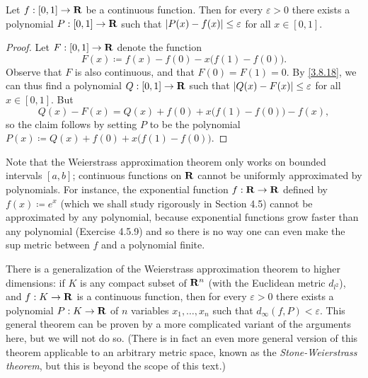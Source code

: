 \begin{corollary}\label{3.8.19}
  Let \(f : [0, 1] \to \mathbf{R}\) be a continuous function.
  Then for every \(\varepsilon > 0\) there exists a polynomial \(P : [0, 1] \to \mathbf{R}\) such that \(\left\lvert P(x) - f(x)\right\rvert \leq \varepsilon\) for all \(x \in [0, 1]\).
\end{corollary}

\begin{proof}
  Let \(F : [0, 1] \to \mathbf{R}\) denote the function
  \[
    F(x) \coloneqq f(x) - f(0) - x \big(f(1) - f(0)\big).
  \]
  Observe that \(F\) is also continuous, and that \(F(0) = F(1) = 0\).
  By \cref{3.8.18}, we can thus find a polynomial \(Q : [0, 1] \to \mathbf{R}\) such that \(\left\lvert Q(x) - F(x)\right\rvert \leq \varepsilon\) for all \(x \in [0, 1]\).
  But
  \[
    Q(x) - F(x) = Q(x) + f(0) + x \big(f(1) - f(0)\big) - f(x),
  \]
  so the claim follows by setting \(P\) to be the polynomial \(P(x) \coloneqq Q(x) + f(0) + x \big(f(1) - f(0)\big)\).
\end{proof}

\begin{remark}\label{3.8.20}
  Note that the Weierstrass approximation theorem only works on bounded intervals \([a, b]\);
  continuous functions on \(\mathbf{R}\) cannot be uniformly approximated by polynomials.
  For instance, the exponential function \(f : \mathbf{R} \to \mathbf{R}\) defined by \(f(x) \coloneqq e^x\) (which we shall study rigorously in Section 4.5) cannot be approximated by any polynomial, because exponential functions grow faster than any polynomial (Exercise 4.5.9) and so there is no way one can even make the sup metric between \(f\) and a polynomial finite.
\end{remark}

\begin{remark}\label{3.8.21}
  There is a generalization of the Weierstrass approximation theorem to higher dimensions:
  if \(K\) is any compact subset of \(\mathbf{R}^n\) (with the Euclidean metric \(d_{l^2}\)), and \(f : K \to \mathbf{R}\) is a continuous function, then for every \(\varepsilon > 0\) there exists a polynomial \(P : K \to \mathbf{R}\) of \(n\) variables \(x_1, \dots, x_n\) such that \(d_\infty(f, P) < \varepsilon\).
  This general theorem can be proven by a more complicated variant of the arguments here, but we will not do so.
  (There is in fact an even more general version of this theorem applicable to an arbitrary metric space, known as the \emph{Stone-Weierstrass theorem}, but this is beyond the scope of this text.)
\end{remark}

